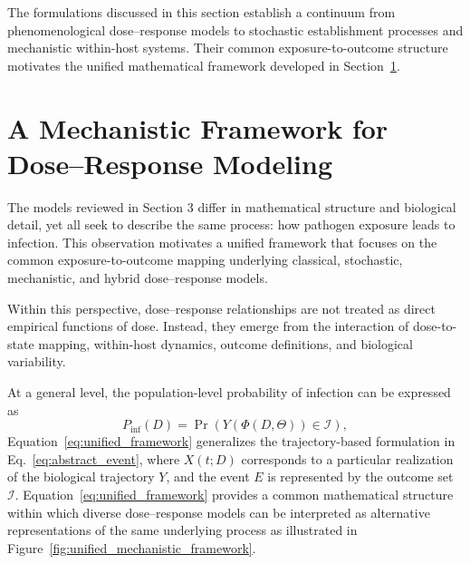\documentclass[11pt]{article}
\begin{document}
The formulations discussed in this section establish a
continuum from phenomenological dose--response models
to stochastic establishment processes and mechanistic
within-host systems. Their common exposure-to-outcome
structure motivates the unified mathematical framework
developed in Section~\ref{sec:mechanistic_framework}.




\section{A Mechanistic Framework for Dose--Response Modeling}
\label{sec:mechanistic_framework}

The models reviewed in Section 3 differ in mathematical structure and biological detail, yet all seek to describe the same process: how pathogen exposure leads to infection. This observation motivates a unified framework that focuses on the common exposure-to-outcome mapping underlying classical, stochastic, mechanistic, and hybrid dose--response models.

Within this perspective, dose--response relationships are not treated as direct empirical functions of dose. Instead, they emerge from the interaction of dose-to-state mapping, within-host dynamics, outcome definitions, and biological variability.%

At a general level, the population-level probability of infection can be expressed as
\begin{equation}
P_{\mathrm{inf}}(D)
=
\Pr\left(
Y(\Phi(D,\Theta))
\in \mathcal I
\right),
\label{eq:unified_framework}
\end{equation}
Equation~\eqref{eq:unified_framework} generalizes the trajectory-based formulation in Eq.~\eqref{eq:abstract_event}, where $X(t;D)$ corresponds to a particular realization of the biological trajectory $Y$, and the event $E$ is represented by the outcome set $\mathcal I$. %
%
Equation~\eqref{eq:unified_framework} provides a common mathematical structure within which diverse dose--response models can be interpreted as alternative representations of the same underlying process as illustrated in Figure~\ref{fig:unified_mechanistic_framework}.
\end{document}
